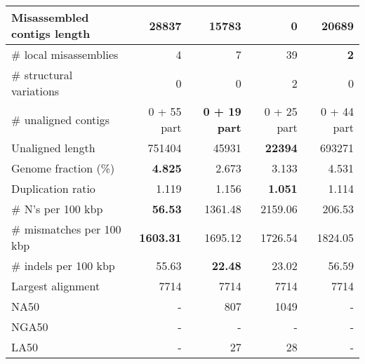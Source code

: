 \documentclass[12pt,a4paper]{article}
\begin{document}
\begin{table}[ht]
\begin{center}
\begin{tabular}{|l*{4}{|r}|}
Misassembled contigs length & 28837 & 15783 & {\bf 0} & 20689 \\ \hline
\# local misassemblies & 4 & 7 & 39 & {\bf 2} \\ \hline
\# structural variations & 0 & 0 & 2 & 0 \\ \hline
\# unaligned contigs & 0 + 55 part & {\bf 0 + 19 part} & 0 + 25 part & 0 + 44 part \\ \hline
Unaligned length & 751404 & 45931 & {\bf 22394} & 693271 \\ \hline
Genome fraction (\%) & {\bf 4.825} & 2.673 & 3.133 & 4.531 \\ \hline
Duplication ratio & 1.119 & 1.156 & {\bf 1.051} & 1.114 \\ \hline
\# N's per 100 kbp & {\bf 56.53} & 1361.48 & 2159.06 & 206.53 \\ \hline
\# mismatches per 100 kbp & {\bf 1603.31} & 1695.12 & 1726.54 & 1824.05 \\ \hline
\# indels per 100 kbp & 55.63 & {\bf 22.48} & 23.02 & 56.59 \\ \hline
Largest alignment & 7714 & 7714 & 7714 & 7714 \\ \hline
NA50 & - & 807 & 1049 & - \\ \hline
NGA50 & - & - & - & - \\ \hline
LA50 & - & 27 & 28 & - \\ \hline
\end{tabular}
\end{center}
\end{table}
\end{document}
